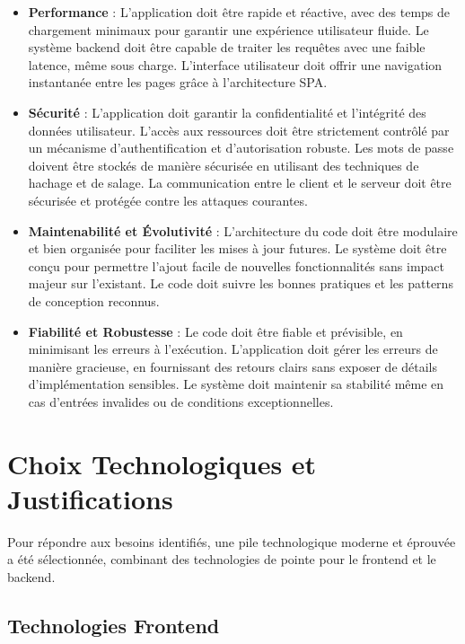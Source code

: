 \begin{itemize}
    \item \textbf{Performance} : L'application doit être rapide et réactive, avec des temps de chargement minimaux pour garantir une expérience utilisateur fluide. Le système backend doit être capable de traiter les requêtes avec une faible latence, même sous charge. L'interface utilisateur doit offrir une navigation instantanée entre les pages grâce à l'architecture SPA.

    \item \textbf{Sécurité} : L'application doit garantir la confidentialité et l'intégrité des données utilisateur. L'accès aux ressources doit être strictement contrôlé par un mécanisme d'authentification et d'autorisation robuste. Les mots de passe doivent être stockés de manière sécurisée en utilisant des techniques de hachage et de salage. La communication entre le client et le serveur doit être sécurisée et protégée contre les attaques courantes.

    \item \textbf{Maintenabilité et Évolutivité} : L'architecture du code doit être modulaire et bien organisée pour faciliter les mises à jour futures. Le système doit être conçu pour permettre l'ajout facile de nouvelles fonctionnalités sans impact majeur sur l'existant. Le code doit suivre les bonnes pratiques et les patterns de conception reconnus.

    \item \textbf{Fiabilité et Robustesse} : Le code doit être fiable et prévisible, en minimisant les erreurs à l'exécution. L'application doit gérer les erreurs de manière gracieuse, en fournissant des retours clairs sans exposer de détails d'implémentation sensibles. Le système doit maintenir sa stabilité même en cas d'entrées invalides ou de conditions exceptionnelles.
\end{itemize}

\section{Choix Technologiques et Justifications}

Pour répondre aux besoins identifiés, une pile technologique moderne et éprouvée a été sélectionnée, combinant des technologies de pointe pour le frontend et le backend.

\subsection{Technologies Frontend}

